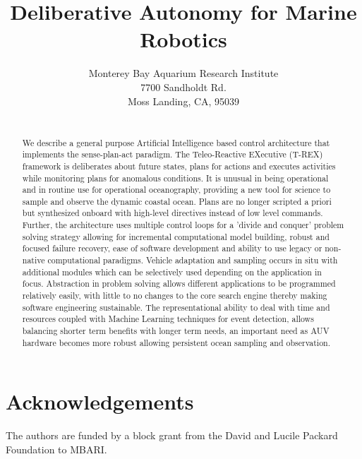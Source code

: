 \documentclass[12pt]{svmono}
\title{\textbf{\sc Deliberative Autonomy for Marine Robotics}}
\author{}
\date{\small Monterey Bay Aquarium Research Institute \\
7700 Sandholdt Rd.\\
Moss Landing,  CA, 95039\\
{\tt }}
\begin{document}
\maketitle

\begin{abstract}
\\
  We describe a general purpose Artificial Intelligence based control
  architecture that implements the sense-plan-act paradigm. The
  Teleo-Reactive EXecutive (T-REX) framework is deliberates about
  future states, plans for actions and executes activities while
  monitoring plans for anomalous conditions. It is unusual in being
  operational and in routine use for operational oceanography,
  providing a new tool for science to sample and observe the dynamic
  coastal ocean. Plans are no longer scripted a priori but synthesized
  onboard with high-level directives instead of low level
  commands. Further, the architecture uses multiple control loops for
  a 'divide and conquer' problem solving strategy allowing for
  incremental computational model building, robust and focused failure
  recovery, ease of software development and ability to use legacy or
  non-native computational paradigms. Vehicle adaptation and sampling
  occurs in situ with additional modules which can be selectively used
  depending on the application in focus. Abstraction in problem
  solving allows different applications to be programmed relatively
  easily, with little to no changes to the core search engine thereby
  making software engineering sustainable. The representational
  ability to deal with time and resources coupled with Machine
  Learning techniques for event detection, allows balancing shorter
  term benefits with longer term needs, an important need as AUV
  hardware becomes more robust allowing persistent ocean sampling and
  observation.
  

\end{abstract}















\section{Acknowledgements}

The authors are funded by a block grant from the David and Lucile
Packard Foundation to MBARI. 


\end{document}
